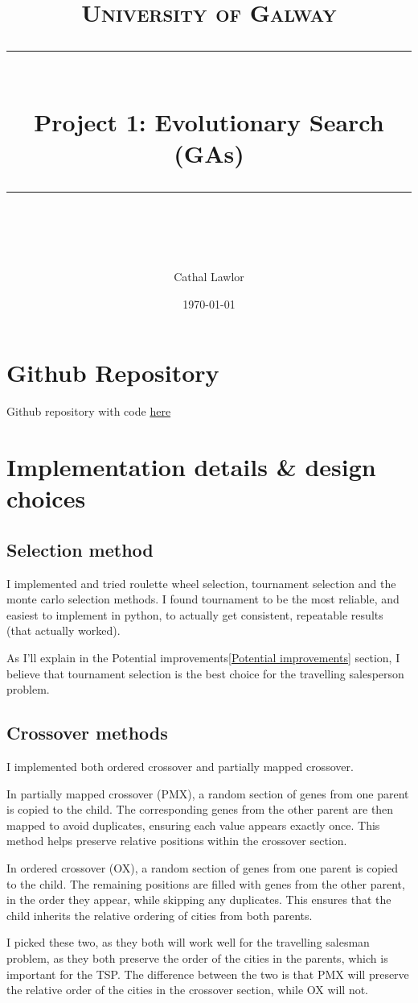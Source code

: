 \documentclass[11pt]{scrartcl} %
\title{	
	\normalfont\normalsize
	\textsc{University of Galway}\\ %
	\vspace{25pt} %
	\rule{\linewidth}{0.5pt}\\ %
	\vspace{20pt} %
	{\huge  Project 1: Evolutionary Search (GAs)}\\ %
	\vspace{12pt} %
	\rule{\linewidth}{2pt}\\ %
	\vspace{12pt} %
}
\author{\LARGE Cathal Lawlor} %
\date{\normalsize\today} %
\begin{document}
\maketitle %

\section{Github Repository}
Github repository with code \href{https://github.com/Laan33/ai_project_1}{here}

\section{Implementation details \& design choices}

\subsection{Selection method}
I implemented and tried roulette wheel selection, tournament selection and the monte carlo selection methods.
I found tournament to be the most reliable, and easiest to implement in python, to actually get consistent, repeatable results (that actually worked).

As I'll explain in the Potential improvements\ref{Potential improvements} section, I believe that tournament selection is the best choice for the travelling salesperson problem.
\subsection{Crossover methods}

I implemented both ordered crossover and partially mapped crossover. 

In partially mapped crossover (PMX)\cite{baeldung_pmx}, a random section of genes from one parent is copied to the child. The corresponding genes from the other parent are then mapped to avoid duplicates, ensuring each value appears exactly once. This method helps preserve relative positions within the crossover section.

In ordered crossover (OX)\cite{ordered_crossover_stackoverflow}, a random section of genes from one parent is copied to the child. The remaining positions are filled with genes from the other parent, in the order they appear, while skipping any duplicates. This ensures that the child inherits the relative ordering of cities from both parents.

I picked these two, as they both will work well for the travelling salesman problem, as they both preserve the order of the cities in the parents, which is important for the TSP.
The difference between the two is that PMX will preserve the relative order of the cities in the crossover section, while OX will not.
\end{document}
